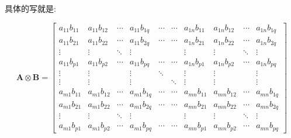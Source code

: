 具体的写就是:

$$\mathbf{A}\otimes\mathbf{B} = \begin{bmatrix}
a_{11} b_{11} & a_{11} b_{12} & \cdots & a_{11} b_{1q} &
\cdots & \cdots & a_{1n} b_{11} & a_{1n} b_{12} & \cdots & a_{1n} b_{1q} \\
a_{11} b_{21} & a_{11} b_{22} & \cdots & a_{11} b_{2q} &
\cdots & \cdots & a_{1n} b_{21} & a_{1n} b_{22} & \cdots & a_{1n} b_{2q} \\
\vdots & \vdots & \ddots & \vdots & & & \vdots & \vdots & \ddots & \vdots \\
a_{11} b_{p1} & a_{11} b_{p2} & \cdots & a_{11} b_{pq} &
\cdots & \cdots & a_{1n} b_{p1} & a_{1n} b_{p2} & \cdots & a_{1n} b_{pq} \\
\vdots & \vdots & & \vdots & \ddots & & \vdots & \vdots & & \vdots \\
\vdots & \vdots & & \vdots & & \ddots & \vdots & \vdots & & \vdots \\
a_{m1} b_{11} & a_{m1} b_{12} & \cdots & a_{m1} b_{1q} &
\cdots & \cdots & a_{mn} b_{11} & a_{mn} b_{12} & \cdots & a_{mn} b_{1q} \\
a_{m1} b_{21} & a_{m1} b_{22} & \cdots & a_{m1} b_{2q} &
\cdots & \cdots & a_{mn} b_{21} & a_{mn} b_{22} & \cdots & a_{mn} b_{2q} \\
\vdots & \vdots & \ddots & \vdots & & & \vdots & \vdots & \ddots & \vdots \\
a_{m1} b_{p1} & a_{m1} b_{p2} & \cdots & a_{m1} b_{pq} &
\cdots & \cdots & a_{mn} b_{p1} & a_{mn} b_{p2} & \cdots & a_{mn} b_{pq}
\end{bmatrix}$$